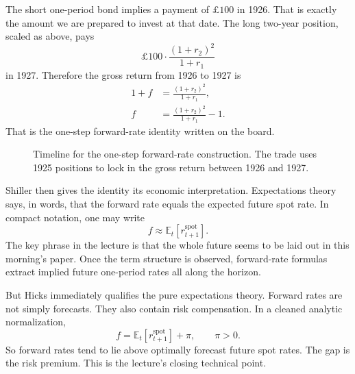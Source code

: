 The short one-period bond implies a payment of \(\pounds 100\) in 1926. That is exactly the amount we are prepared to invest at that date. The long two-year position, scaled as above, pays
\[
\pounds 100\cdot \frac{(1+r_2)^2}{1+r_1}
\]
in 1927. Therefore the gross return from 1926 to 1927 is
\begin{align}
1+f &= \frac{(1+r_2)^2}{1+r_1}, \\
f &= \frac{(1+r_2)^2}{1+r_1}-1.
\end{align}
That is the one-step forward-rate identity written on the board.

\begin{figure}[t]
\centering
{}
\caption{Timeline for the one-step forward-rate construction. The trade uses 1925 positions to lock in the gross return between 1926 and 1927.}
\end{figure}

Shiller then gives the identity its economic interpretation. Expectations theory says, in words, that the forward rate equals the expected future spot rate. In compact notation, one may write
\begin{equation}
f \approx \mathbb{E}_t\!\left[r^{\text{spot}}_{t+1}\right].
\end{equation}
The key phrase in the lecture is that the whole future seems to be laid out in this morning's paper. Once the term structure is observed, forward-rate formulas extract implied future one-period rates all along the horizon.

But Hicks immediately qualifies the pure expectations theory. Forward rates are not simply forecasts. They also contain risk compensation. In a cleaned analytic normalization,
\begin{equation}
f=\mathbb{E}_t\!\left[r^{\text{spot}}_{t+1}\right]+\pi,
\qquad
\pi>0.
\end{equation}
So forward rates tend to lie above optimally forecast future spot rates. The gap is the risk premium. This is the lecture's closing technical point.

